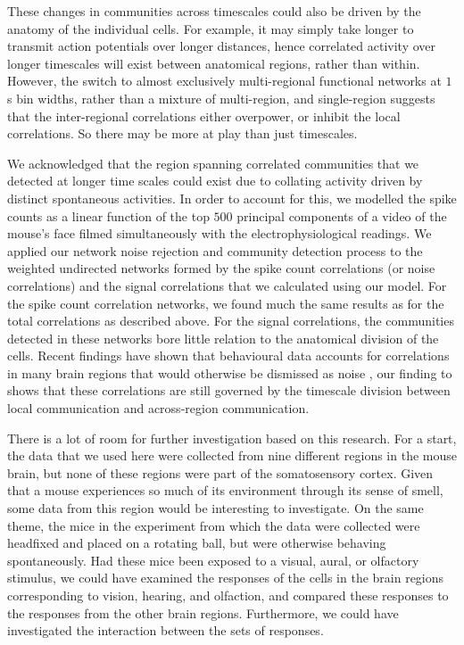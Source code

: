 These changes in communities across timescales could also be driven by the anatomy of the individual cells. For example, it may simply take longer to transmit action potentials over longer distances, hence correlated activity over longer timescales will exist between anatomical regions, rather than within. However, the switch to almost exclusively multi-regional functional networks at $1$s bin widths, rather than a mixture of multi-region, and single-region suggests that the inter-regional correlations either overpower, or inhibit the local correlations. So there may be more at play than just timescales.

We acknowledged that the region spanning correlated communities that we detected at longer time scales could exist due to collating activity driven by distinct spontaneous activities. In order to account for this, we modelled the spike counts as a linear function of the top $500$ principal components of a video of the mouse's face filmed simultaneously with the electrophysiological readings. We applied our network noise rejection and community detection process to the weighted undirected networks formed by the spike count correlations (or noise correlations) and the signal correlations that we calculated using our model. For the spike count correlation networks, we found much the same results as for the total correlations as described above. For the signal correlations, the communities detected in these networks bore little relation to the anatomical division of the cells. Recent findings have shown that behavioural data accounts for correlations in many brain regions that would otherwise be dismissed as noise \parencite{stringer}, our finding to shows that these correlations are still governed by the timescale division between local communication and across-region communication.

There is a lot of room for further investigation based on this research. For a start, the data that we used here were collected from nine different regions in the mouse brain, but none of these regions were part of the somatosensory cortex. Given that a mouse experiences so much of its environment through its sense of smell, some data from this region would be interesting to investigate. On the same theme, the mice in the experiment from which the data were collected were headfixed and placed on a rotating ball, but were otherwise behaving spontaneously. Had these mice been exposed to a visual, aural, or olfactory stimulus, we could have examined the responses of the cells in the brain regions corresponding to vision, hearing, and olfaction, and compared these responses to the responses from the other brain regions. Furthermore, we could have investigated the interaction between the sets of responses.

